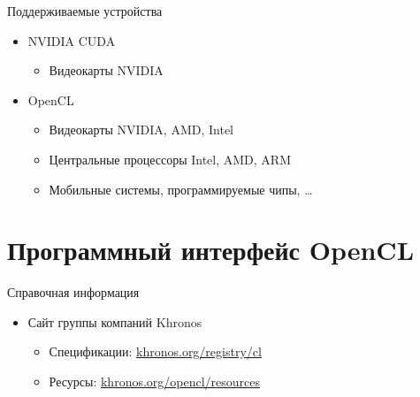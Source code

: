 \documentclass[@BEAMER_OPTIONS@]{beamer}
\begin{document}

\begin{frame}{Поддерживаемые устройства}
    \begin{itemize}
        \item NVIDIA CUDA
            \begin{itemize}
                \item Видеокарты NVIDIA
            \end{itemize}
        \item OpenCL
            \begin{itemize}
                \item Видеокарты NVIDIA, AMD, Intel
                \item Центральные процессоры Intel, AMD, ARM
                \item Мобильные системы, программируемые чипы, \ldots
            \end{itemize}
    \end{itemize}
\end{frame}

\section{Программный интерфейс OpenCL}
\begin{frame}
    \sectionpage
\end{frame}

\begin{frame}{Справочная информация}
    \begin{itemize}
        \item Сайт группы компаний Khronos
            \begin{itemize}
                \item Спецификации: \href{http://khronos.org/registry/cl}{khronos.org/registry/cl}
                \item Ресурсы: \href{http://khronos.org/opencl/resources}{khronos.org/opencl/resources}
            \end{itemize}
    \end{itemize}
\end{frame}
\end{document}
